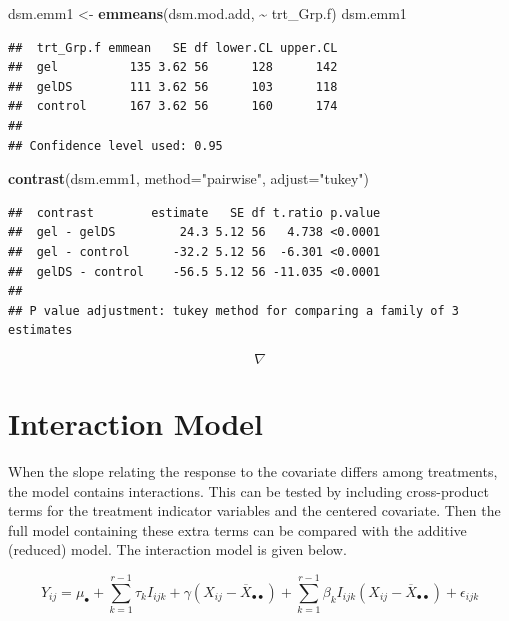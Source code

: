 \documentclass[
]{book}
\newenvironment{Shaded}{\begin{snugshade}}{\end{snugshade}}
\newcommand{\AttributeTok}[1]{\textcolor[rgb]{0.13,0.29,0.53}{#1}}
\newcommand{\FunctionTok}[1]{\textcolor[rgb]{0.13,0.29,0.53}{\textbf{#1}}}
\newcommand{\NormalTok}[1]{#1}
\newcommand{\OtherTok}[1]{\textcolor[rgb]{0.56,0.35,0.01}{#1}}
\newcommand{\SpecialCharTok}[1]{\textcolor[rgb]{0.81,0.36,0.00}{\textbf{#1}}}
\newcommand{\StringTok}[1]{\textcolor[rgb]{0.31,0.60,0.02}{#1}}
\begin{document}
\begin{Shaded}
\begin{Highlighting}[]
\NormalTok{dsm.emm1 }\OtherTok{\textless{}{-}} \FunctionTok{emmeans}\NormalTok{(dsm.mod.add, }\SpecialCharTok{\textasciitilde{}}\NormalTok{ trt\_Grp.f)}
\NormalTok{dsm.emm1}
\end{Highlighting}
\end{Shaded}

\begin{verbatim}
##  trt_Grp.f emmean   SE df lower.CL upper.CL
##  gel          135 3.62 56      128      142
##  gelDS        111 3.62 56      103      118
##  control      167 3.62 56      160      174
## 
## Confidence level used: 0.95
\end{verbatim}

\begin{Shaded}
\begin{Highlighting}[]
\FunctionTok{contrast}\NormalTok{(dsm.emm1, }\AttributeTok{method=}\StringTok{"pairwise"}\NormalTok{, }\AttributeTok{adjust=}\StringTok{"tukey"}\NormalTok{)}
\end{Highlighting}
\end{Shaded}

\begin{verbatim}
##  contrast        estimate   SE df t.ratio p.value
##  gel - gelDS         24.3 5.12 56   4.738 <0.0001
##  gel - control      -32.2 5.12 56  -6.301 <0.0001
##  gelDS - control    -56.5 5.12 56 -11.035 <0.0001
## 
## P value adjustment: tukey method for comparing a family of 3 estimates
\end{verbatim}

\[\nabla  \]

\section{Interaction Model}\label{interaction-model}

When the slope relating the response to the covariate differs among
treatments, the model contains interactions. This can be tested by
including cross-product terms for the treatment indicator variables and
the centered covariate. Then the full model containing these extra terms
can be compared with the additive (reduced) model. The interaction model
is given below.

\[
Y_{ij}= \mu_{\bullet} + \sum_{k=1}^{r-1}\tau_k I_{ijk}  + 
\gamma \left(X_{ij}-\overline{X}_{\bullet\bullet}\right) +
\sum_{k=1}^{r-1}\beta_kI_{ijk}\left(X_{ij}-\overline{X}_{\bullet\bullet}\right) +
\epsilon_{ijk}
\]
\end{document}
